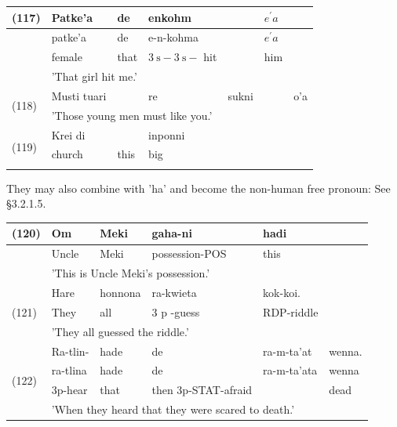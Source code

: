 \documentclass[10pt]{article}
\begin{document}
\begin{center}
\begin{tabular}{|l|l|l|l|l|l|l|}
\hline
\multirow[t]{4}{*}{(117)} & Patke'a & de & enkohm &  & \(e^{\prime} a\) &  \\
\hline
 & patke'a & de & e-n-kohma &  & \(e^{\prime} a\) &  \\
\hline
 & female & that & \(3 \mathrm{~s}-3 \mathrm{~s}-\) hit &  & him &  \\
\hline
 & \multicolumn{6}{|l|}{'That girl hit me.'} \\
\hline
\multirow[t]{2}{*}{(118)} & Musti tuari &  & re & sukni &  & o'a \\
\hline
 & \multicolumn{6}{|l|}{'Those young men must like you.'} \\
\hline
\multirow[t]{3}{*}{(119)} & Krei di &  & inponni &  &  &  \\
\hline
 & church & this & big &  &  &  \\
\hline
 & \multicolumn{2}{|c|}{} &  &  &  &  \\
\hline
\end{tabular}
\end{center}

They may also combine with 'ha' and become the non-human free pronoun: See §3.2.1.5.

\begin{center}
\begin{tabular}{|l|l|l|l|l|l|}
\hline
\multirow[t]{3}{*}{(120)} & Om & Meki & gaha-ni & hadi &  \\
\hline
 & Uncle & Meki & possession-POS & this &  \\
\hline
 & \multicolumn{5}{|l|}{'This is Uncle Meki's possession.'} \\
\hline
\multirow[t]{3}{*}{(121)} & Hare & honnona & ra-kwieta & kok-koi. &  \\
\hline
 & They & all & 3 p -guess & RDP-riddle &  \\
\hline
 & \multicolumn{5}{|l|}{'They all guessed the riddle.'} \\
\hline
\multirow[t]{4}{*}{(122)} & Ra-tlin- & hade & de & ra-m-ta'at & wenna. \\
\hline
 & ra-tlina & hade & de & ra-m-ta'ata & wenna \\
\hline
 & 3p-hear & that & then 3p-STAT-afraid &  & dead \\
\hline
 & \multicolumn{5}{|l|}{'When they heard that they were scared to death.'} \\
\hline
\end{tabular}
\end{center}
\end{document}
